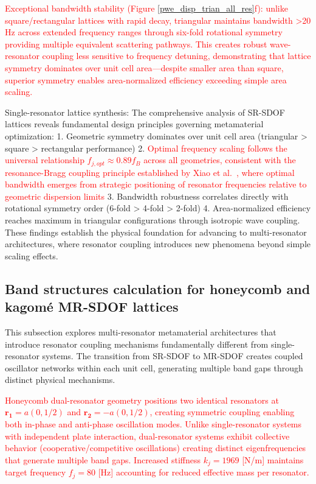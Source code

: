 \documentclass[review,numbers,sort&compress]{elsarticle}
\begin{document}
{\textcolor{red}{Exceptional bandwidth stability (Figure \ref{pwe_disp_trian_all_res}f): unlike square/rectangular lattices with rapid decay, triangular maintains bandwidth >20 Hz across extended frequency ranges through six-fold rotational symmetry providing multiple equivalent scattering pathways. This creates robust wave-resonator coupling less sensitive to frequency detuning, demonstrating that lattice symmetry dominates over unit cell area—despite smaller area than square, superior symmetry enables area-normalized efficiency exceeding simple area scaling.}


Single-resonator lattice synthesis: The comprehensive analysis of SR-SDOF lattices reveals fundamental design principles governing metamaterial optimization:
1. Geometric symmetry dominates over unit cell area (triangular > square > rectangular performance)
2. \textcolor{red}{Optimal frequency scaling follows the universal relationship $f_{j,opt} \approx 0.89 f_B$ across all geometries, consistent with the resonance-Bragg coupling principle established by Xiao et al.~\cite{Xiao_2012}, where optimal bandwidth emerges from strategic positioning of resonator frequencies relative to geometric dispersion limits}
3. Bandwidth robustness correlates directly with rotational symmetry order (6-fold > 4-fold > 2-fold)
4. Area-normalized efficiency reaches maximum in triangular configurations through isotropic wave coupling.
These findings establish the physical foundation for advancing to multi-resonator architectures, where resonator coupling introduces new phenomena beyond simple scaling effects.


\subsection{Band structures calculation for honeycomb and kagomé MR-SDOF lattices}
\label{kh_disp_pwe}
This subsection explores multi-resonator metamaterial architectures that introduce resonator coupling mechanisms fundamentally different from single-resonator systems. The transition from SR-SDOF to MR-SDOF creates coupled oscillator networks within each unit cell, generating multiple band gaps through distinct physical mechanisms.

\textcolor{red}{Honeycomb dual-resonator geometry positions two identical resonators at \( \mathbf{r_1} = a(0, 1/2) \) and \( \mathbf{r_2} = -a(0, 1/2) \), creating symmetric coupling enabling both in-phase and anti-phase oscillation modes. Unlike single-resonator systems with independent plate interaction, dual-resonator systems exhibit collective behavior (cooperative/competitive oscillations) creating distinct eigenfrequencies that generate multiple band gaps. Increased stiffness \( k_j = 1969 \) [N/m] maintains target frequency \( f_j = 80 \) [Hz] accounting for reduced effective mass per resonator.}

}
\end{document}
